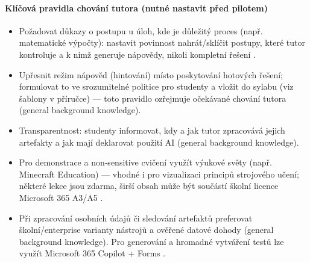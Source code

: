 \documentclass{report}%
\begin{document}
\paragraph{Klíčová pravidla chování tutora (nutné nastavit před pilotem)}
\begin{itemize}
  \item Požadovat důkazy o postupu u úloh, kde je důležitý proces (např. matematické výpočty): nastavit povinnost nahrát/sklíčit postupy, které tutor kontroluje a k nimž generuje nápovědy, nikoli kompletní řešení \cite{kb_ai_101_tipu_pdf_04e4a115_page_8_1}.
  \item Upřesnit režim nápověd (hintování) místo poskytování hotových řešení; formulovat to ve srozumitelné politice pro studenty a vložit do sylabu (viz šablony v příručce) — toto pravidlo ozřejmuje očekávané chování tutora (general background knowledge).
  \item Transparentnost: studenty informovat, kdy a jak tutor zpracovává jejich artefakty a jak mají deklarovat použití AI (general background knowledge).
  \item Pro demonstrace a non‑sensitive cvičení využít výukové světy (např. Minecraft Education) — vhodné i pro vizualizaci principů strojového učení; některé lekce jsou zdarma, širší obsah může být součástí školní licence Microsoft 365 A3/A5 \cite{kb_ai_101_tipu_pdf_04e4a115_page_15_2}.
  \item Při zpracování osobních údajů či sledování artefaktů preferovat školní/enterprise varianty nástrojů a ověřené datové dohody (general background knowledge). Pro generování a hromadné vytváření testů lze využít Microsoft 365 Copilot + Forms \cite{kb_ai_101_tipu_pdf_04e4a115_page_36_1}.
\end{itemize}
\end{document}
